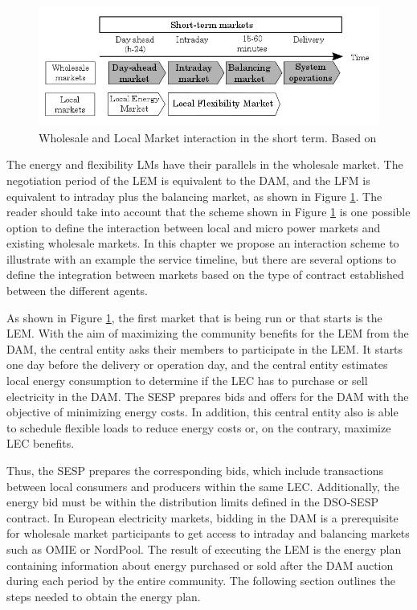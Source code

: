 \begin{figure}[]
	\centering
	\includegraphics[width=1\columnwidth ]{ChapterIntro/Figures/LM_WSM_Interaction.jpg}
		\caption{Wholesale and Local Market interaction in the short term. Based on \cite{InternationalEnergyAgency2016}}
	\label{fig:212}  
\end{figure}


The energy and flexibility LMs have their parallels in the wholesale market. The negotiation period of the LEM is equivalent to the DAM, and the LFM is equivalent to intraday plus the balancing market, as shown in Figure \ref{fig:212}. The reader should take into account that the scheme shown in Figure \ref{fig:212} is one possible option to define the interaction between local and micro power markets and existing wholesale markets. In this chapter we propose an interaction scheme to illustrate with an example the service timeline, but there are several options to define the integration between markets based on the type of contract established between the different agents.

As shown in Figure \ref{fig:212}, the first market that is being run or that starts is the LEM. With the aim of maximizing the community benefits for the LEM from the DAM, the central entity asks their members to participate in the LEM. It starts one day before the delivery or operation day, and the central entity estimates local energy consumption to determine if the LEC has to purchase or sell electricity in the DAM. The SESP prepares bids and offers for the DAM with the objective of minimizing energy costs. In addition, this central entity also is able to schedule flexible loads to reduce energy costs or, on the contrary, maximize LEC benefits.

Thus, the SESP prepares the corresponding bids, which include transactions between local consumers and producers within the same LEC.
Additionally, the energy bid must be within the distribution limits defined in the DSO-SESP contract. In European electricity markets, bidding in the DAM is a prerequisite for wholesale market participants to get access to intraday and balancing markets such as OMIE or NordPool. The result of executing the LEM is the energy plan containing information about energy purchased or sold after the DAM auction during each period by the entire community. The following section outlines the steps needed to obtain the energy plan.

